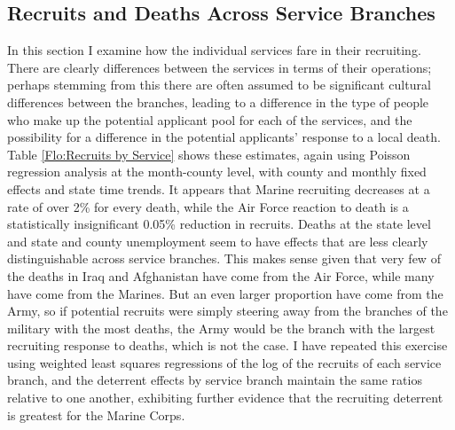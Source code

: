 \documentclass[12pt] {article}
\begin{document}
\subsection{Recruits and Deaths Across Service Branches}
In this section I examine how the individual services fare in their
recruiting. There are clearly differences between the services in
terms of their operations; perhaps stemming from this there are often
assumed to be significant cultural differences between the branches,
leading to a difference in the type of people who make up the potential
applicant pool for each of the services, and the possibility for a
difference in the potential applicants' response to a local death.
Table \ref{Flo:Recruits by Service} shows these estimates, again
using Poisson regression analysis at the month-county level, with county
and monthly fixed effects and state time trends. It appears that Marine
recruiting decreases at a rate of over 2\% for every death, while
the Air Force reaction to death is a statistically insignificant 0.05\%
reduction in recruits. Deaths at the state level and state and county
unemployment seem to have effects that are less clearly distinguishable
across service branches. This makes sense given that very few of the
deaths in Iraq and Afghanistan have come from the Air Force, while
many have come from the Marines. But an even larger proportion have
come from the Army, so if potential recruits were simply steering
away from the branches of the military with the most deaths, the Army
would be the branch with the largest recruiting response to deaths,
which is not the case. I have repeated this exercise using weighted
least squares regressions of the log of the recruits of each service
branch, and the deterrent effects by service branch maintain the same
ratios relative to one another, exhibiting further evidence that the
recruiting deterrent is greatest for the Marine Corps. 
\end{document}
